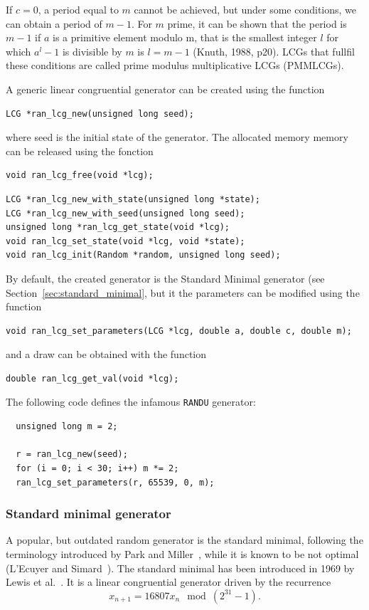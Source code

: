 If $c = 0$, a period equal to $m$ cannot be achieved, but under some
conditions, we can obtain a period of $m-1$.
For $m$ prime, it can be shown that the period is $m-1$ if $a$ is a
primitive element modulo m, that is the smallest integer $l$ for which
$a^l-1$ is divisible by $m$ is $l=m-1$ (Knuth, 1988, p20).
LCGs that fullfil these conditions are called prime modulus
multiplicative LCGs (PMMLCGs).

A generic linear congruential generator can be created using the function
\begin{verbatim}
LCG *ran_lcg_new(unsigned long seed);
\end{verbatim}
where seed is the initial state of the generator.
The allocated memory memory can be released using the fonction
\begin{verbatim}
void ran_lcg_free(void *lcg);
\end{verbatim}

\begin{verbatim}
LCG *ran_lcg_new_with_state(unsigned long *state);
LCG *ran_lcg_new_with_seed(unsigned long seed);
unsigned long *ran_lcg_get_state(void *lcg);
void ran_lcg_set_state(void *lcg, void *state);
void ran_lcg_init(Random *random, unsigned long seed);
\end{verbatim}

By default, the created generator is the Standard Minimal generator (see
Section~\ref{sec:standard_minimal}, but it the parameters can be
modified using the function
\begin{verbatim}
void ran_lcg_set_parameters(LCG *lcg, double a, double c, double m);
\end{verbatim}
and a draw can be obtained with the function
\begin{verbatim}
double ran_lcg_get_val(void *lcg);
\end{verbatim}
The following code defines the infamous \verb|RANDU| generator:
\begin{lstlisting}
  unsigned long m = 2;

  r = ran_lcg_new(seed);
  for (i = 0; i < 30; i++) m *= 2;
  ran_lcg_set_parameters(r, 65539, 0, m);
\end{lstlisting}

\subsubsection{Standard minimal generator}
\label{sec:standard_minimal}

A popular, but outdated random generator is the standard minimal,
following the terminology introduced by Park and
Miller~\cite{ParkMill88}, while it is known to be not optimal
(L'Ecuyer and Simard~\cite{LEcuSima07}).
The standard minimal has been introduced in 1969 by Lewis et
al.~\cite{LewiGoodMill69}.
It is a linear congruential generator driven by the recurrence
\[
  x_{n+1} = 16807x_n \mod (2^{31}- 1).
\]

